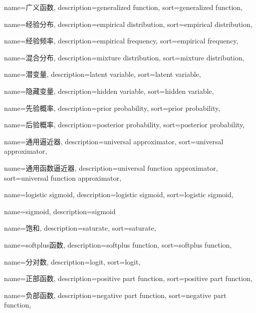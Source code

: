 {
  name=广义函数,
  description={generalized function},
  sort={generalized function},
}

{
  name=经验分布,
  description={empirical distribution},
  sort={empirical distribution},
}

{
  name=经验频率,
  description={empirical frequency},
  sort={empirical frequency},
}

{
  name=混合分布,
  description={mixture distribution},
  sort={mixture distribution},
}

{
  name=潜变量,
  description={latent variable},
  sort={latent variable},
}

{
  name=隐藏变量,
  description={hidden variable},
  sort={hidden variable},
}

{
  name=先验概率,
  description={prior probability},
  sort={prior probability},
}

{
  name=后验概率,
  description={posterior probability},
  sort={posterior probability},
}

{
  name=通用逼近器,
  description={universal approximator},
  sort={universal approximator},
}

{
  name=通用函数逼近器,
  description={universal function approximator},
  sort={universal function approximator},
}

{
  name=logistic sigmoid,
  description={logistic sigmoid},
  sort={logistic sigmoid},
}

{
  name=sigmoid,
  description={sigmoid}
}

{
  name=饱和,
  description={saturate},
  sort={saturate},
}

{
  name=softplus函数,
  description={softplus function},
  sort={softplus function},
}

{
  name=分对数,
  description={logit},
  sort={logit},
}

{
  name=正部函数,
  description={positive part function},
  sort={positive part function},
}

{
  name=负部函数,
  description={negative part function},
  sort={negative part function},
}

